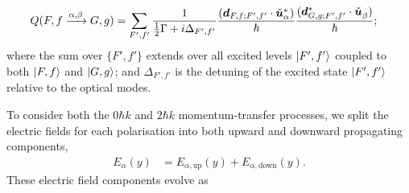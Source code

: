 \begin{align}
    Q(F, f \xrightarrow{\alpha, \beta} G, g) &= \sum_{F',f'}\frac{1}{\frac{1}{2}\Gamma + i \Delta_{F',f'}} \frac{(\bm{d}_{F, f; F', f'} \cdot \check{\bm{u}}_\alpha^*)}{\hbar} \frac{(\bm{d}_{G, g; F', f'}^* \cdot \check{\bm{u}}_\beta^{\phantom{*}})}{\hbar};
\end{align}
where the sum over $\{F', f'\}$ extends over all excited levels ${\left|F', f'\right>}$ coupled to both ${\left|F, f\right>}$ and ${\left|G, g\right>}$; and $\Delta_{F', f'}$ is the detuning of the excited state ${\left|F', f'\right>}$ relative to the optical modes.

To consider both the $0 \hbar k$ and $2 \hbar k$ momentum-transfer processes, we split the electric fields for each polarisation into both upward and downward propagating components,
\begin{align}
    E_{\alpha}(y) &= E_{\alpha, \text{up}}(y) + E_{\alpha, \text{down}}(y).
\end{align}
These electric field components evolve as
